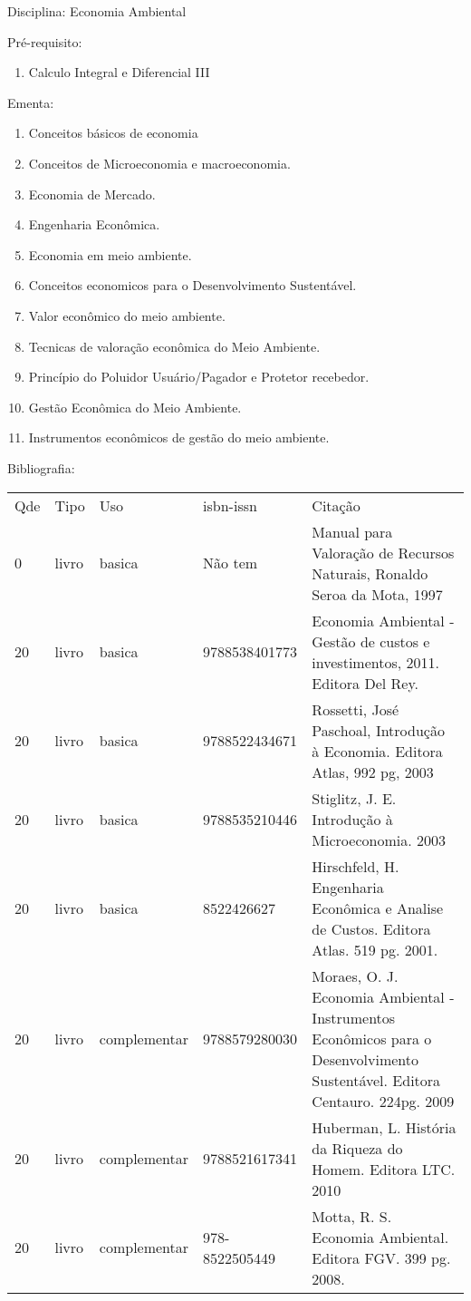 \documentclass[12pt,a4paper,twoside]{report}
\begin{document}
Disciplina: Economia Ambiental

Pré-requisito:
\begin{enumerate}
\item Calculo Integral e Diferencial III
\end{enumerate}

Ementa:
\begin{enumerate}
\item Conceitos básicos de economia
\item Conceitos de Microeconomia e macroeconomia.
\item Economia de Mercado.
\item Engenharia Econômica.
\item Economia em meio ambiente.
\item Conceitos economicos para o Desenvolvimento Sustentável.
\item Valor econômico do meio ambiente.
\item Tecnicas de valoração econômica do Meio Ambiente.
\item Princípio do Poluidor Usuário/Pagador e Protetor recebedor.
\item Gestão Econômica do Meio Ambiente.
\item Instrumentos econômicos de gestão do meio ambiente.
\end{enumerate}

Bibliografia:
\begin{tabular}{lllll}
Qde & Tipo & Uso & isbn-issn & Citação \\
0&livro&basica&Não tem&Manual para Valoração de Recursos Naturais, Ronaldo Seroa da Mota, 1997\\
20&livro&basica&9788538401773&Economia Ambiental - Gestão de custos e investimentos, 2011. Editora Del Rey.\\
20&livro&basica&9788522434671&Rossetti, José Paschoal, Introdução à Economia. Editora Atlas, 992 pg, 2003\\
20&livro&basica&9788535210446&Stiglitz, J. E. Introdução à Microeconomia. 2003\\
20&livro&basica&8522426627&Hirschfeld, H. Engenharia Econômica e Analise de Custos. Editora Atlas. 519 pg. 2001.\\
20&livro&complementar&9788579280030&Moraes, O. J. Economia Ambiental - Instrumentos Econômicos para o Desenvolvimento Sustentável. Editora Centauro. 224pg. 2009\\
20&livro&complementar&9788521617341&Huberman, L. História da Riqueza do Homem. Editora LTC. 2010\\
20&livro&complementar&978-8522505449&Motta, R. S. Economia Ambiental. Editora FGV. 399 pg. 2008.\\
\end{tabular}
\end{document}
